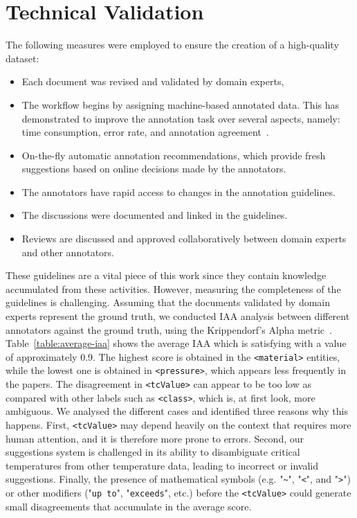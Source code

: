 \documentclass[]{interact}
\theoremstyle{plain}%
\theoremstyle{definition}
\theoremstyle{remark}
\begin{document}
\label{sec:technical-validation}
\section{Technical Validation} 
The following measures were employed to ensure the creation of a high-quality dataset: 
\begin{itemize}
    \item Each document was revised and validated by domain experts, 
    \item The workflow begins by assigning machine-based annotated data. This has demonstrated to improve the annotation task over several aspects, namely: time consumption, error rate, and annotation agreement~\cite{Fort2010InfluenceOP,Nvol2011SemiautomaticSA,Lingren2014EvaluatingTI}.
    \item On-the-fly automatic annotation recommendations, which provide fresh suggestions based on online decisions made by the annotators.
    \item The annotators have rapid access to changes in the annotation guidelines.
    \item The discussions were documented and linked in the guidelines. 
    \item Reviews are discussed and approved collaboratively between domain experts and other annotators.
\end{itemize}

These guidelines are a vital piece of this work since they contain knowledge accumulated from these activities.
However, measuring the completeness of the guidelines is challenging. 
Assuming that the documents validated by domain experts represent the ground truth, we conducted IAA analysis between different annotators against the ground truth, using the Krippendorf's Alpha metric~\cite{Krippendorff2004ReliabilityIC}.
Table~\ref{table:average-iaa} shows the average IAA which is satisfying with a value of approximately 0.9. 
The highest score is obtained in the \texttt{<material>} entities, while the lowest one is obtained in \texttt{<pressure>}, which appears less frequently in the papers. 
The disagreement in \texttt{<tcValue>} can appear to be too low as compared with other labels such as \texttt{<class>}, which is, at first look, more ambiguous. 
We analysed the different cases and identified three reasons why this happens. 
First, \texttt{<tcValue>} may depend heavily on the context that requires more human attention, and it is therefore more prone to errors. 
Second, our suggestions system is challenged in its ability to disambiguate critical temperatures from other temperature data, leading to incorrect or invalid suggestions. 
Finally, the presence of mathematical symbols (e.g. "\texttt{\~}", "\texttt{<}", and "\texttt{>}") or other modifiers ("\texttt{up to}", "\texttt{exceeds}", etc.) before the \texttt{<tcValue>} could generate small disagreements that accumulate in the average score. 
\end{document}
